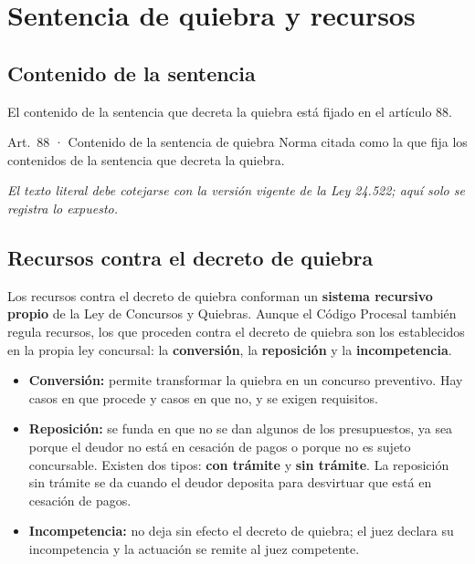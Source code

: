 \documentclass[12pt,oneside]{book}
\begin{document}
\section{Sentencia de quiebra y recursos}

\subsection{Contenido de la sentencia}

El contenido de la sentencia que decreta la quiebra está fijado en el artículo 88.

\begin{norma}{Art.~88 · Contenido de la sentencia de quiebra}
Norma citada como la que fija los contenidos de la sentencia que decreta la quiebra.

\par\smallskip\textit{El texto literal debe cotejarse con la versión vigente de la Ley 24.522; aquí solo se registra lo expuesto.}
\end{norma}

\subsection{Recursos contra el decreto de quiebra}

Los recursos contra el decreto de quiebra conforman un \textbf{sistema recursivo propio} de la Ley de Concursos y Quiebras. Aunque el Código Procesal también regula recursos, los que proceden contra el decreto de quiebra son los establecidos en la propia ley concursal: la \textbf{conversión}, la \textbf{reposición} y la \textbf{incompetencia}.

\begin{itemize}
    \item \textbf{Conversión:} permite transformar la quiebra en un concurso preventivo. Hay casos en que procede y casos en que no, y se exigen requisitos.
    \item \textbf{Reposición:} se funda en que no se dan algunos de los presupuestos, ya sea porque el deudor no está en cesación de pagos o porque no es sujeto concursable. Existen dos tipos: \textbf{con trámite} y \textbf{sin trámite}. La reposición sin trámite se da cuando el deudor deposita para desvirtuar que está en cesación de pagos.
    \item \textbf{Incompetencia:} no deja sin efecto el decreto de quiebra; el juez declara su incompetencia y la actuación se remite al juez competente.
\end{itemize}
\end{document}

